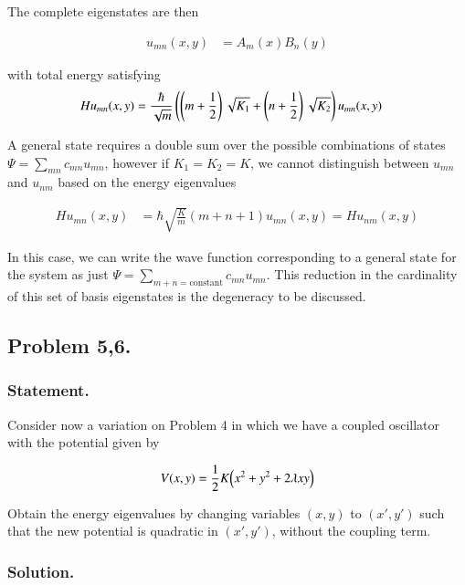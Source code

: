The complete eigenstates are then

\begin{align}\label{eqn:desaiCh9:405}
u_{mn}(x,y) &= A_m(x) B_n(y)
\end{align}

with total energy satisfying
\begin{align}\label{eqn:desaiCh9:406}
H u_{mn}(x,y) &=
\frac{\hbar}{\sqrt{m}} \left( \left(m + \frac{1}{2}\right) \sqrt{K_1} + \left(n + \frac{1}{2}\right) \sqrt{K_2} \right) u_{mn}(x,y)
\end{align}

A general state requires a double sum over the possible combinations of states $\Psi = \sum_{mn} c_{mn} u_{mn}$, however if $K_1 = K_2 = K$, we cannot distinguish between $u_{mn}$ and $u_{nm}$ based on the energy eigenvalues

\begin{align}\label{eqn:desaiCh9:407}
H u_{mn}(x,y) &= \hbar\sqrt{\frac{K}{m}} \left( m + n + 1 \right) u_{mn}(x,y) = H u_{nm}(x,y)
\end{align}

In this case, we can write the wave function corresponding to a general state for the system as just $\Psi = \sum_{m+ n = \text{constant}} c_{mn} u_{mn}$.  This reduction in the cardinality of this set of basis eigenstates is the degeneracy to be discussed.

\subsection{Problem 5,6.}
\subsubsection{Statement.}

Consider now a variation on Problem 4 in which we have a coupled oscillator with the potential given by

\begin{align}\label{eqn:desaiCh9:500}
V(x,y) = \frac{1}{2} K \Bigl( x^2 + y^2 + 2 \lambda x y \Bigr)
\end{align}

Obtain the energy eigenvalues by changing variables $(x,y)$ to $(x', y')$ such that the new potential is quadratic in $(x', y')$, without the coupling term.

\subsubsection{Solution.}

